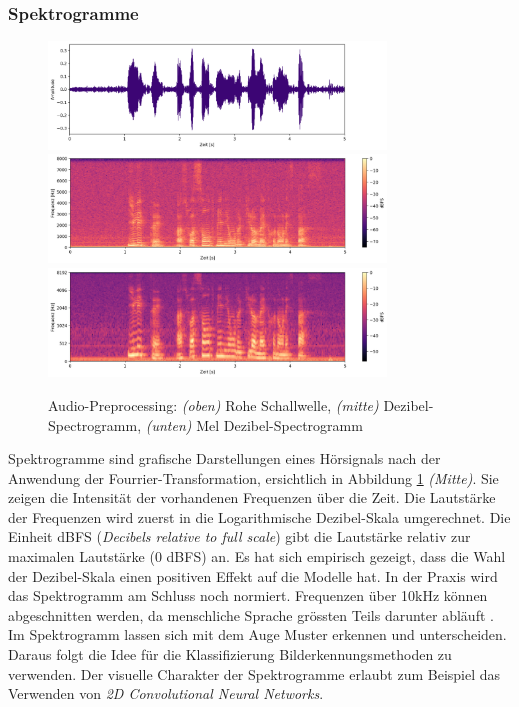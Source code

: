 \subsubsection{Spektrogramme} 
\begin{figure}[hbt]
	\centering
		\includegraphics[width=0.8\textwidth]{assets/audio_raw.png}
		\includegraphics[width=0.8\textwidth]{assets/audio_linear.png}
		\includegraphics[width=0.8\textwidth]{assets/audio_mel.png}
	\centering
	\caption{Audio-Preprocessing: \textit{(oben)} Rohe Schallwelle, \textit{(mitte)}
		     Dezibel-Spectrogramm, 
		     \textit{(unten)} Mel Dezibel-Spectrogramm}
	\label{img:preprocessing}
\end{figure}
Spektrogramme sind grafische Darstellungen eines Hörsignals nach der Anwendung der Fourrier-Transformation\parencite[]['Spectrograms']{fourrier}, ersichtlich in Abbildung \ref{img:preprocessing} \textit{(Mitte)}. Sie zeigen die Intensität der vorhandenen Frequenzen über die Zeit. Die Lautstärke der Frequenzen wird zuerst in die Logarithmische Dezibel-Skala umgerechnet. Die Einheit dBFS (\textit{Decibels relative to full scale}) gibt die Lautstärke relativ zur maximalen Lautstärke (0 dBFS) an. Es hat sich empirisch gezeigt, dass die Wahl der Dezibel-Skala einen positiven Effekt auf die Modelle hat. In der Praxis wird das Spektrogramm am Schluss noch normiert. Frequenzen über 10kHz können abgeschnitten werden, da menschliche Sprache grössten Teils darunter abläuft \parencite{tenkHz}. Im Spektrogramm lassen sich mit dem Auge Muster erkennen und unterscheiden. Daraus folgt die Idee für die Klassifizierung Bilderkennungsmethoden zu verwenden. Der visuelle Charakter der Spektrogramme erlaubt zum Beispiel das Verwenden von \textit{2D Convolutional Neural Networks}.

